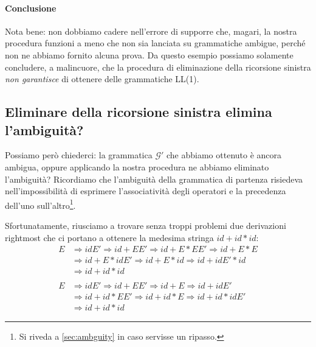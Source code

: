 \documentclass[class=book, crop=false, oneside, 12pt]{standalone}
\begin{document}
\paragraph{Conclusione}
Nota bene: non dobbiamo cadere nell'errore di supporre che, magari, la nostra procedura funzioni a meno che non sia lanciata su grammatiche ambigue, perché non ne abbiamo fornito alcuna prova. Da questo  esempio possiamo solamente concludere, a malincuore, che la procedura di eliminazione della ricorsione sinistra \emph{non garantisce} di ottenere delle grammatiche LL(1).

\subsection{Eliminare della ricorsione sinistra elimina l'ambiguità?}
Possiamo però chiederci: la grammatica \(\mathcal{G'}\) che abbiamo ottenuto è ancora ambigua, oppure applicando la nostra procedura ne abbiamo eliminato l'ambiguità? Ricordiamo che l'ambiguità della grammatica di partenza risiedeva nell'impossibilità di esprimere l'associatività degli operatori e la precedenza dell'uno sull'altro\footnote{Si riveda a \ref{sec:ambguity} in caso servisse un ripasso.}. 

Sfortunatamente, riusciamo a trovare senza troppi problemi due derivazioni rightmost che ci portano a ottenere la medesima stringa \(id + id * id\):
\begin{align*}
    E &\Rightarrow idE' \Rightarrow id + EE' \Rightarrow id + E * EE' \Rightarrow id + E * E \\
        &\Rightarrow id + E * idE' \Rightarrow id + E * id \Rightarrow id + idE' * id \\
        &\Rightarrow id + id * id 
    \\ \\
    E &\Rightarrow idE' \Rightarrow id + EE' \Rightarrow id + E \Rightarrow id + idE' \\
        &\Rightarrow id + id * EE' \Rightarrow id + id * E \Rightarrow id + id * idE' \\
        &\Rightarrow id + id * id  
\end{align*}
\end{document}
